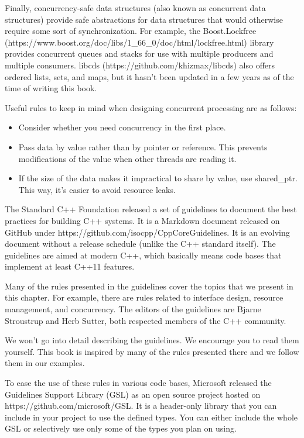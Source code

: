 Finally, concurrency-safe data structures (also known as concurrent data structures) provide safe abstractions for data structures that would otherwise require some sort of synchronization. For example, the Boost.Lockfree (https://www.boost.org/doc/libs/1\_66\_0/doc/html/lockfree.html) library provides concurrent queues and stacks for use with multiple producers and multiple consumers. libcds (https://github.com/khizmax/libcds) also offers ordered lists, sets, and maps, but it hasn't been updated in a few years as of the time of writing this book.

Useful rules to keep in mind when designing concurrent processing are as follows:

\begin{itemize}
\item 
Consider whether you need concurrency in the first place.

\item 
Pass data by value rather than by pointer or reference. This prevents modifications of the value when other threads are reading it.

\item 
If the size of the data makes it impractical to share by value, use shared\_ptr. This way, it's easier to avoid resource leaks.
\end{itemize}


The Standard C++ Foundation released a set of guidelines to document the best practices for building C++ systems. It is a Markdown document released on GitHub under https://github.com/isocpp/CppCoreGuidelines. It is an evolving document without a release schedule (unlike the C++ standard itself). The guidelines are aimed at modern C++, which basically means code bases that implement at least C++11 features.

Many of the rules presented in the guidelines cover the topics that we present in this chapter. For example, there are rules related to interface design, resource management, and concurrency. The editors of the guidelines are Bjarne Stroustrup and Herb Sutter, both respected members of the C++ community.

We won't go into detail describing the guidelines. We encourage you to read them yourself. This book is inspired by many of the rules presented there and we follow them in our examples.

To ease the use of these rules in various code bases, Microsoft released the Guidelines Support Library (GSL) as an open source project hosted on https://github.com/microsoft/GSL. It is a header-only library that you can include in your project to use the defined types. You can either include the whole GSL or selectively use only some of the types you plan on using.

